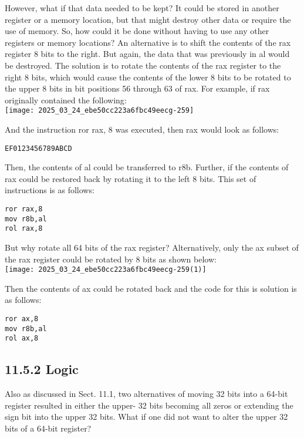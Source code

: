 \documentclass[10pt]{article}
\begin{document}
However, what if that data needed to be kept? It could be stored in another register or a memory location, but that might destroy other data or require the use of memory. So, how could it be done without having to use any other registers or memory locations? An alternative is to shift the contents of the rax register 8 bits to the right. But again, the data that was previously in al would be destroyed. The solution is to rotate the contents of the rax register to the right 8 bits, which would cause the contents of the lower 8 bits to be rotated to the upper 8 bits in bit positions 56 through 63 of rax. For example, if rax originally contained the following:\\
\texttt{[image: 2025\_03\_24\_ebe50cc223a6fbc49eecg-259]}

And the instruction ror rax, 8 was executed, then rax would look as follows:

\begin{verbatim}
EF0123456789ABCD
\end{verbatim}

Then, the contents of al could be transferred to r8b. Further, if the contents of rax could be restored back by rotating it to the left 8 bits. This set of instructions is as follows:

\begin{verbatim}
ror rax,8
mov r8b,al
rol rax,8
\end{verbatim}

But why rotate all 64 bits of the rax register? Alternatively, only the ax subset of the rax register could be rotated by 8 bits as shown below:\\
\texttt{[image: 2025\_03\_24\_ebe50cc223a6fbc49eecg-259(1)]}

Then the contents of ax could be rotated back and the code for this is solution is as follows:

\begin{verbatim}
ror ax,8
mov r8b,al
rol ax,8
\end{verbatim}

\subsection*{11.5.2 Logic}
Also as discussed in Sect. 11.1, two alternatives of moving 32 bits into a 64-bit register resulted in either the upper- 32 bits becoming all zeros or extending the sign bit into the upper 32 bits. What if one did not want to alter the upper 32 bits of a 64-bit register?
\end{document}
